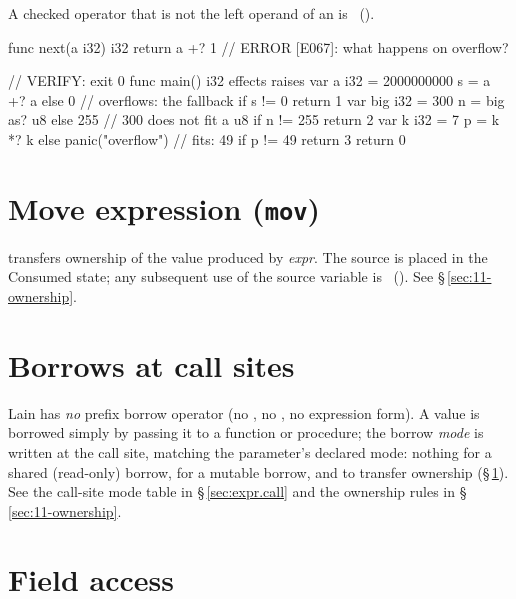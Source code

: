 \begin{constraint}
  A checked operator that is not the left operand of an  is
  \illformed{}~().
\end{constraint}

\begin{laincode}
func next(a i32) i32 {
    return a +? 1                 // ERROR [E067]: what happens on overflow?
}
\end{laincode}

\begin{laincode}
// VERIFY: exit 0
func main() i32 effects raises {
    var a i32 = 2000000000
    s = a +? a else 0                  // overflows: the fallback
    if s != 0 { return 1 }
    var big i32 = 300
    n = big as? u8 else 255            // 300 does not fit a u8
    if n != 255 { return 2 }
    var k i32 = 7
    p = k *? k else panic("overflow")  // fits: 49
    if p != 49 { return 3 }
    return 0
}
\end{laincode}

\section{Move expression (\texttt{mov})}
\label{sec:expr.mov}

\pnum
{} transfers ownership of the value produced by \textit{expr}.
The source is placed in the Consumed state; any subsequent use of the
source variable is \illformed{}~().  See \S\,\ref{sec:11-ownership}.

\section{Borrows at call sites}
\label{sec:expr.borrow}

\pnum
Lain has \emph{no} prefix borrow operator (no \lain{\&}, no , no
 expression form).  A value is borrowed simply by passing it to a
function or procedure; the borrow \emph{mode} is written at the call site,
matching the parameter's declared mode: nothing for a shared (read-only)
borrow,  for a mutable borrow, and  to transfer ownership
(\S\,\ref{sec:expr.mov}).  See the call-site mode table in
\S\,\ref{sec:expr.call} and the ownership rules in \S\,\ref{sec:11-ownership}.

\section{Field access}
\label{sec:expr.field}

